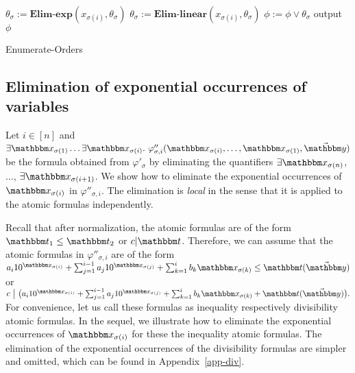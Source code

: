 {\begin{algorithm}[t]
{        
        {
            $\theta_{\sigma}:= \textbf{Elim-exp}(x_{\sigma(i)},\theta_{\sigma})$\;
            $\theta_{\sigma}:= \textbf{Elim-linear}(x_{\sigma(i)},\theta_{\sigma})$\;
        }
        $\phi :=  \phi \vee \theta_{\sigma}$\;
    }
    output $\phi$
    \caption{Enumerate-Orders}
\end{algorithm}
}

\vspace*{-3mm}
\subsection{Elimination of  exponential occurrences of variables}\label{sec-elim-exp}

Let $i \in [n]$ and $\exists \ivarx_{\sigma(1)} \ldots \exists \ivarx_{\sigma(i)}.\ \varphi''_{\sigma,i}(\ivarx_{\sigma(i)}, \ldots, \ivarx_{\sigma(1)}, \vec{\ivary})$ be the formula obtained from $\varphi'_\sigma$ by eliminating the quantifiers $\exists \ivarx_{\sigma(n)}$, $\ldots$, $\exists \ivarx_{\sigma(i+1)}$. We show how to eliminate the exponential occurrences of $\ivarx_{\sigma(i)}$ in $\varphi''_{\sigma,i}$. The elimination is \emph{local} in the sense that it is applied to the atomic formulas independently. 

Recall that after normalization, the atomic formulas are of the form $\iterm_1 \le \iterm_2$ or $c | \iterm$. Therefore, we can assume that the atomic formulas in $\varphi''_{\sigma,i}$ are  of the form 
%
$a_i 10^{\ivarx_{\sigma(i)}}+\sum_{j=1}^{i-1} a_j 10^{\ivarx_{\sigma(j)}} + \sum_{k=1}^{i}b_k \ivarx_{\sigma(k)} \le \iterm(\vec{\ivary})$
or  
$c \ \big  | \ \big(a_i 10^{\ivarx_{\sigma(i)}}+\sum_{j=1}^{i-1} a_j 10^{\ivarx_{\sigma(j)}} + \sum_{k=1}^{i}b_k \ivarx_{\sigma(k)} + \iterm(\vec{\ivary})\big).$
%
For convenience, let us call these formulas as inequality respectively divisibility atomic formulas. In the sequel, we illustrate how to eliminate the exponential occurrences of $\ivarx_{\sigma(i)}$ for these the inequality atomic formulas. The elimination of the exponential occurrences of the divisibility formulas are simpler and omitted, which can be found in Appendix~\ref{app-div}. 

